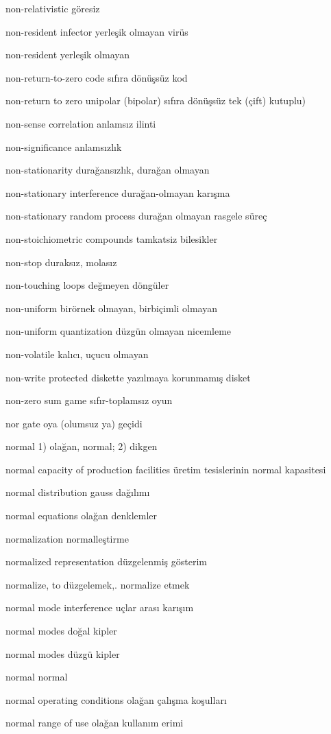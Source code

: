 \documentclass[12pt,fleqn]{article}\usepackage{../../common}
\begin{document}
non-relativistic göresiz

non-resident infector yerleşik olmayan virüs

non-resident yerleşik olmayan

non-return-to-zero code sıfıra dönüşsüz kod

non-return to zero unipolar (bipolar) sıfıra dönüşsüz tek (çift) kutuplu)

non-sense correlation anlamsız ilinti

non-significance anlamsızlık

non-stationarity durağansızlık, durağan olmayan

non-stationary interference durağan-olmayan karışma

non-stationary random process durağan olmayan rasgele süreç

non-stoichiometric compounds tamkatsiz bilesikler

non-stop duraksız, molasız

non-touching loops değmeyen döngüler

non-uniform birörnek olmayan, birbiçimli olmayan

non-uniform quantization düzgün olmayan nicemleme

non-volatile kalıcı, uçucu olmayan

non-write protected diskette yazılmaya korunmamış disket

non-zero sum game sıfır-toplamsız oyun

nor gate oya (olumsuz ya) geçidi

normal 1) olağan, normal; 2) dikgen

normal capacity of production facilities üretim tesislerinin normal kapasitesi

normal distribution gauss dağılımı

normal equations olağan denklemler

normalization normalleştirme

normalized representation düzgelenmiş gösterim

normalize, to düzgelemek,. normalize etmek

normal mode interference uçlar arası karışım

normal modes doğal kipler

normal modes düzgü kipler

normal normal

normal operating conditions olağan çalışma koşulları

normal range of use olağan kullanım erimi
\end{document}
